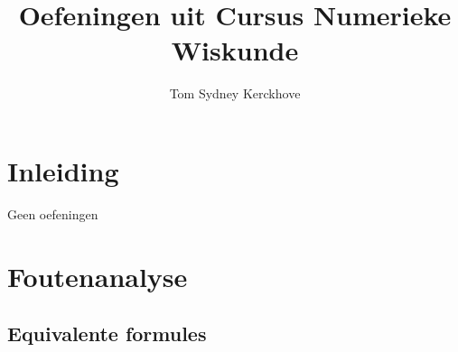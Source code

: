 \documentclass[12pt,a4paper]{article}
\author{Tom Sydney Kerckhove}
\title{Oefeningen uit Cursus Numerieke Wiskunde}
\begin{document}
\maketitle

\section{Inleiding}
Geen oefeningen
\section{Foutenanalyse}
\subsection{Equivalente formules}
\end{document}
